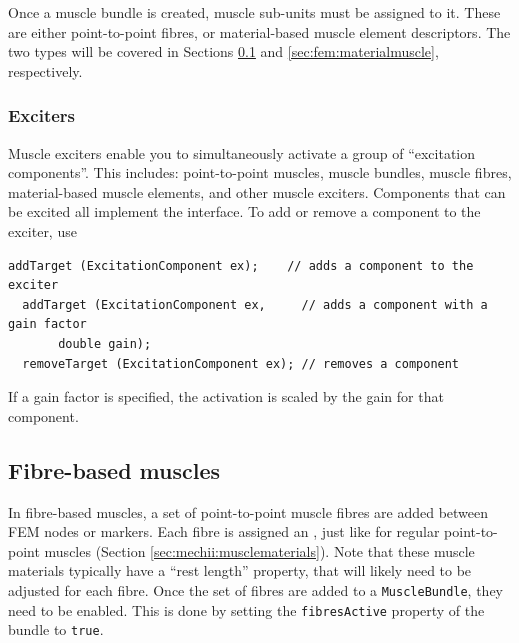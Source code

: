 Once a muscle bundle is created, muscle sub-units must be assigned to it.  These
are either point-to-point fibres, or material-based muscle element descriptors.
The two types will be covered in Sections \ref{sec:fem:fibremuscle} and
\ref{sec:fem:materialmuscle}, respectively.

\subsubsection{Exciters}
\ifLaTeXML{\newline}

Muscle exciters enable you to simultaneously activate a group of ``excitation 
components''.  This includes: point-to-point muscles, muscle bundles, muscle
fibres, material-based muscle elements, and other muscle exciters.  Components 
that can be excited all implement the 
interface.  To add or remove a component to the exciter, use
\begin{lstlisting}[]
  addTarget (ExcitationComponent ex);    // adds a component to the exciter
  addTarget (ExcitationComponent ex,     // adds a component with a gain factor
  	   double gain);   
  removeTarget (ExcitationComponent ex); // removes a component
\end{lstlisting}
If a gain factor is specified, the activation is scaled by the gain for that
component.

\subsection{Fibre-based muscles}
\label{sec:fem:fibremuscle}

In fibre-based muscles, a set of point-to-point muscle fibres are added between
FEM nodes or markers.  Each fibre is assigned an 
, just like for 
regular point-to-point muscles (Section \ref{sec:mechii:musclematerials}).  Note
that these muscle materials typically have a ``rest length'' property, that will
likely need to be adjusted for each fibre.  Once the set of fibres are added
to a {\tt MuscleBundle}, they need to be enabled.  This is done by setting
the {\tt fibresActive} property of the bundle to {\tt true}.

